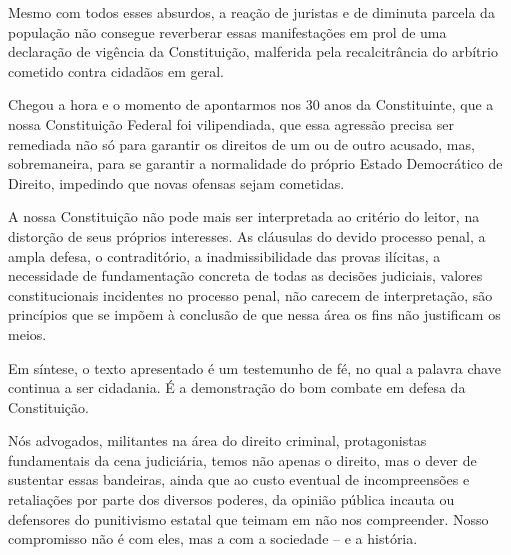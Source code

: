 Mesmo com todos esses absurdos, a reação de juristas e de diminuta
parcela da população não consegue reverberar essas manifestações em prol
de uma declaração de vigência da Constituição, malferida pela
recalcitrância do arbítrio cometido contra cidadãos em geral.

Chegou a hora e o momento de apontarmos nos 30 anos da Constituinte, que
a nossa Constituição Federal foi vilipendiada, que essa agressão precisa
ser remediada não só para garantir os direitos de um ou de outro
acusado, mas, sobremaneira, para se garantir a normalidade do próprio
Estado Democrático de Direito, impedindo que novas ofensas sejam
cometidas.

A nossa Constituição não pode mais ser interpretada ao critério do
leitor, na distorção de seus próprios interesses. As cláusulas do devido
processo penal, a ampla defesa, o contraditório, a inadmissibilidade das
provas ilícitas, a necessidade de fundamentação concreta de todas as
decisões judiciais, valores constitucionais incidentes no processo
penal, não carecem de interpretação, são princípios que se impõem à
conclusão de que nessa área os fins não justificam os meios.

Em síntese, o texto apresentado é um testemunho de fé, no qual a palavra
chave continua a ser cidadania. É a demonstração do bom combate em
defesa da Constituição.

Nós advogados, militantes na área do direito criminal, protagonistas
fundamentais da cena judiciária, temos não apenas o direito, mas o dever
de sustentar essas bandeiras, ainda que ao custo eventual de
incompreensões e retaliações por parte dos diversos poderes, da opinião
pública incauta ou defensores do punitivismo estatal que teimam em não
nos compreender. Nosso compromisso não é com eles, mas a com a sociedade
-- e a história.
